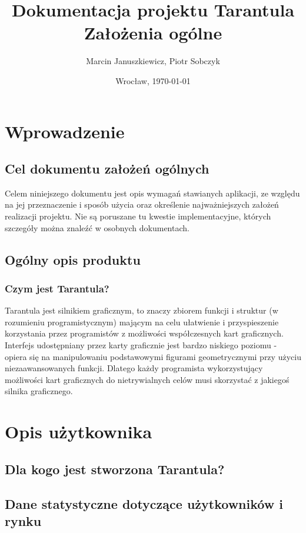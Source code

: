 \documentclass[11pt,leqno]{article}
\title{\LARGE Dokumentacja projektu \textbf{Tarantula}\\
							Założenia ogólne}
\author{Marcin Januszkiewicz, Piotr Sobczyk}
\date{Wrocław, \today}
\begin{document}
\maketitle 
\newpage
\pagestyle{headings}
\tableofcontents

\newpage


\newpage
\section{Wprowadzenie}

\subsection{Cel dokumentu założeń ogólnych}
Celem niniejszego dokumentu jest opis wymagań stawianych aplikacji, ze względu na jej przeznaczenie i 
sposób użycia oraz określenie najważniejszych założeń realizacji projektu. 
Nie są poruszane tu kwestie implementacyjne, których szczegóły można znaleźć w osobnych dokumentach.

\subsection{Ogólny opis produktu}
\subsubsection{Czym jest Tarantula?}
Tarantula jest silnikiem graficznym, to znaczy zbiorem funkcji i struktur (w rozumieniu programistycznym) mającym 
na celu ułatwienie i przyspieszenie korzystania przez programistów z możliwości współczesnych kart graficznych. 
Interfejs udostępniany przez karty graficznie jest bardzo niskiego poziomu - 
opiera się na manipulowaniu podstawowymi figurami geometrycznymi przy użyciu niezaawansowanych funkcji. 
Dlatego każdy programista wykorzystujący możliwości kart graficznych do nietrywialnych celów musi skorzystać z jakiegoś silnika graficznego.

\section{Opis użytkownika}
\subsection{Dla kogo jest stworzona Tarantula?}

\subsection{Dane statystyczne dotyczące użytkowników i rynku}
\end{document}
